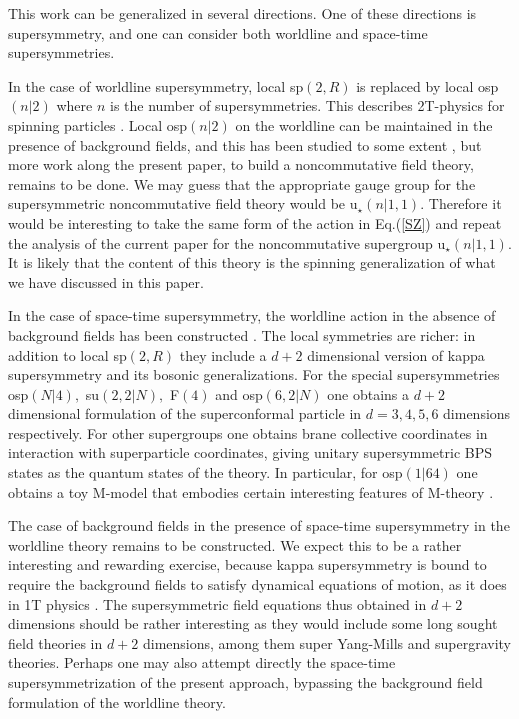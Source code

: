 \documentclass[a4paper,12pt]{article}
\begin{document}
This work can be generalized in several directions. One of these directions
is supersymmetry, and one can consider both worldline and space-time
supersymmetries.

In the case of worldline supersymmetry, local sp$\left( 2,R\right) $ is
replaced by local osp$\left( n|2\right) $ where $n$ is the number of
supersymmetries. This describes 2T-physics for spinning particles \cite
{spin2t}. Local osp$\left( n|2\right) $ on the worldline can be maintained
in the presence of background fields, and this has been studied to some
extent \cite{field2T}, but more work along the present paper, to build a
noncommutative field theory, remains to be done. We may guess that the
appropriate gauge group for the supersymmetric noncommutative field theory
would be u$_{\star }\left( n|1,1\right) .$ Therefore it would be interesting
to take the same form of the action in Eq.(\ref{SZ}) and repeat the analysis
of the current paper for the noncommutative supergroup u$_{\star }\left(
n|1,1\right) .$ It is likely that the content of this theory is the spinning
generalization of what we have discussed in this paper.

In the case of space-time supersymmetry, the worldline action in the absence
of background fields has been constructed \cite{super2t}\cite{survey2T}. The
local symmetries are richer: in addition to local sp$\left( 2,R\right) $
they include a $d+2$ dimensional version of kappa supersymmetry and its
bosonic generalizations. For the special supersymmetries osp$\left(
N|4\right) ,$ su$\left( 2,2|N\right) ,$ F$\left( 4\right) $ and osp$\left(
6,2|N\right) $ one obtains a $d+2$ dimensional formulation of the
superconformal particle in $d=3,4,5,6$ dimensions respectively. For other
supergroups one obtains brane collective coordinates in interaction with
superparticle coordinates, giving unitary supersymmetric BPS states as the
quantum states of the theory. In particular, for osp$(1|64)$ one obtains a
toy M-model that embodies certain interesting features of M-theory \cite
{super2t}\cite{survey2T}.

The case of background fields in the presence of space-time supersymmetry in
the worldline theory remains to be constructed. We expect this to be a
rather interesting and rewarding exercise, because kappa supersymmetry is
bound to require the background fields to satisfy dynamical equations of
motion, as it does in 1T physics \cite{wittsusy}. The supersymmetric field
equations thus obtained in $d+2$ dimensions should be rather interesting as
they would include some long sought field theories in $d+2$ dimensions,
among them super Yang-Mills and supergravity theories. Perhaps one may also
attempt directly the space-time supersymmetrization of the present approach,
bypassing the background field formulation of the worldline theory.
\end{document}
